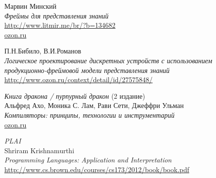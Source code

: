 \begin{thebibliography}{99}

Марвин Минский\\
\emph{Фреймы для представления знаний}\\
\url{http://www.litmir.me/br/?b=134682}\\ 
\href{http://www.ozon.ru/context/detail/id/31747338/}{ozon.ru}

П.Н.Бибило, В.И.Романов\\
\emph{Логическое проектирование дискретных устройств с использованием
продукционно-фреймовой модели представления знаний}\\
\url{http://www.ozon.ru/context/detail/id/27575848/}

 \textit{Книга дракона / пурпурный дракон} (2 издание)\\
Альфред Ахо, Моника С. Лам, Рави Сети, Джеффри Ульман\\
\emph{Компиляторы: принципы, технологии и инструментарий}\\
\href{https://www.ozon.ru/context/detail/id/3829076/?gclid=Cj0KCQjwzK_bBRDDARIsAFQF7zMjx6XCdudrHmuN0CRn2LL3-mydPE-VSxPZglOVxJl9V7zJ96VzBV4aAsfcEALw_wcB}{ozon.ru}

 \textit{PLAI}\\
Shriram Krishnamurthi\\
\emph{Programming Languages: Application and Interpretation}\\
\url{http://www.cs.brown.edu/courses/cs173/2012/book/book.pdf}

\end{thebibliography}
